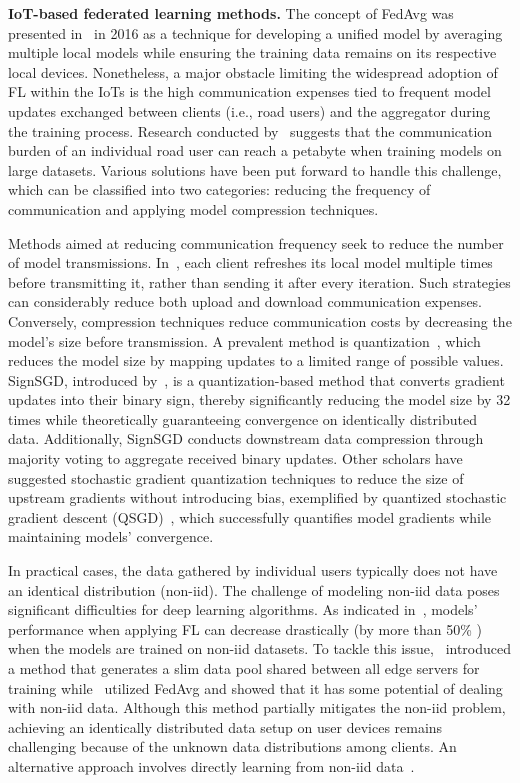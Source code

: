 \textbf{IoT-based federated learning methods.} 
The concept of FedAvg was presented in~\cite{konevcny2016federated} in 2016 as a technique for developing a unified model by averaging multiple local models while ensuring the training data remains on its respective local devices. Nonetheless, a major obstacle limiting the widespread adoption of FL within the IoTs is the high communication expenses tied to frequent model updates exchanged between clients (i.e., road users) and the aggregator during the training process. Research conducted by~\cite{sattler2019sparse} suggests that the communication burden of an individual road user can reach a petabyte when training models on large datasets. Various solutions have been put forward to handle this challenge, which can be classified into two categories: reducing the frequency of communication and applying model compression techniques.

Methods aimed at reducing communication frequency seek to reduce the number of model transmissions. In~\cite{mcmahan2017communication,konevcny2016federated}, each client refreshes its local model multiple times before transmitting it, rather than sending it after every iteration. Such strategies can considerably reduce both upload and download communication expenses. 
Conversely, compression techniques reduce communication costs by decreasing the model's size before transmission.
A prevalent method is quantization~\cite{alistarh2017qsgd}, which reduces the model size by mapping updates to a limited range of possible values. SignSGD, introduced by~\cite{bernstein2018signsgd}, is a quantization-based method that converts gradient updates into their binary sign, thereby significantly reducing the model size by 32 times while theoretically guaranteeing convergence on identically distributed data. Additionally, SignSGD conducts downstream data compression through majority voting to aggregate received binary updates. Other scholars have suggested stochastic gradient quantization techniques to reduce the size of upstream gradients without introducing bias, exemplified by quantized stochastic gradient descent (QSGD)~\cite{alistarh2017qsgd}, which successfully quantifies model gradients while maintaining models' convergence.

In practical cases, the data gathered by individual users typically does not have an identical distribution (non-iid). The challenge of modeling non-iid data poses significant difficulties for deep learning algorithms. As indicated in~\cite{zhao2018federated,saha2024federated}, models' performance when applying FL can decrease drastically (by more than 50\% ) when the models are trained on non-iid datasets. To tackle this issue,~\cite{zhao2018federated} introduced a method that generates a slim data pool shared between all edge servers for training while~\cite{saha2024federated} utilized FedAvg and showed that it has some potential of dealing with non-iid data. Although this method partially mitigates the non-iid problem, achieving an identically distributed data setup on user devices remains challenging because of the unknown data distributions among clients. An alternative approach involves directly learning from non-iid data~\cite{briggs2020federated,chen2020asynchronous,shoham2019overcoming,li2024iofl,li2024feature}.

